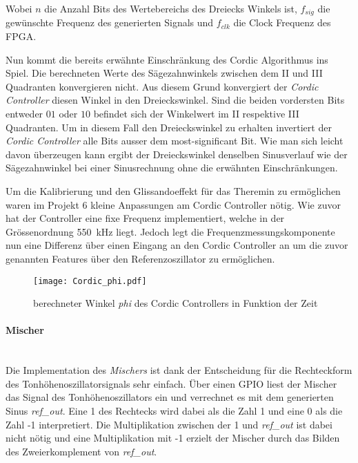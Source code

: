 Wobei \(n\) die Anzahl Bits des Wertebereichs des Dreiecks Winkels ist, \(f_{sig}\) die gewünschte Frequenz des generierten Signals und \(f_{clk}\) die Clock Frequenz des FPGA.

Nun kommt die bereits erwähnte Einschränkung des Cordic Algorithmus ins Spiel. Die berechneten Werte des Sägezahnwinkels zwischen dem II und III Quadranten konvergieren nicht. Aus diesem Grund konvergiert der \textit{Cordic Controller} diesen Winkel in den Dreieckswinkel. Sind die beiden vordersten Bits entweder \(01\) oder \(10\) befindet sich der Winkelwert im II respektive III Quadranten. Um in diesem Fall den Dreieckswinkel zu erhalten invertiert der \textit{Cordic Controller} alle Bits ausser dem most-significant Bit. Wie man sich leicht davon überzeugen kann ergibt der Dreieckswinkel denselben Sinusverlauf wie der Sägezahnwinkel bei einer Sinusrechnung ohne die erwähnten Einschränkungen. \cite{Cordic}

Um die Kalibrierung und den Glissandoeffekt für das Theremin zu ermöglichen waren im Projekt 6 kleine Anpassungen am Cordic Controller nötig. Wie zuvor hat der Controller eine fixe Frequenz implementiert, welche in der Grössenordnung \SI{550}{kHz} liegt. Jedoch legt die Frequenzmessungskomponente nun eine Differenz über einen Eingang an den Cordic Controller an um die zuvor genannten Features über den Referenzoszillator zu ermöglichen.


\begin{figure}[h!]
	\centering
	\texttt{[image: Cordic\_phi.pdf]}
	\caption{berechneter Winkel \textit{phi} des Cordic Controllers in Funktion der Zeit} 
	\label{img:Cordic_phi}
\end{figure}  


\paragraph{Mischer}\mbox{}\\

Die Implementation des \textit{Mischers} ist dank der Entscheidung für die Rechteckform des Tonhöhenoszillatorsignals sehr einfach. Über einen GPIO liest der Mischer das Signal des Tonhöhenoszillators ein und verrechnet es mit dem generierten Sinus \textit{ref\_out}. Eine 1 des Rechtecks wird dabei als die Zahl 1 und eine 0 als die Zahl -1 interpretiert. Die Multiplikation zwischen der 1 und \textit{ref\_out} ist dabei nicht nötig und eine Multiplikation mit -1 erzielt der Mischer durch das Bilden des Zweierkomplement von \textit{ref\_out}.

